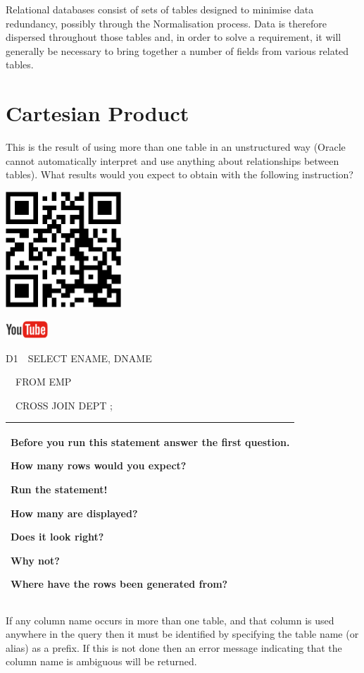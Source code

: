 Relational databases consist of sets of tables designed to minimise data redundancy, possibly through the Normalisation process.  Data is therefore dispersed throughout those tables and, in order to solve a requirement, it will generally be necessary to bring together a number of fields from various related tables.  

\section{Cartesian Product}
This is the result of using more than one table in an unstructured way (Oracle cannot automatically interpret and use anything about relationships between tables).  What results would you expect to obtain with the following  instruction?



\begin{center}
\begin{minipage}{4.849cm}
   
\includegraphics[width=4.341cm,height=4.341cm]{images/img (36).png}
 

   
\includegraphics[width=1.582cm,height=0.674cm]{images/img (15).png}
 
\end{minipage}
\end{center}
D1\ \ SELECT ENAME, DNAME 

\ \ FROM EMP

\ \ CROSS JOIN DEPT ;

\begin{flushleft}
\tablefirsthead{}
\tablehead{}
\tabletail{}
\tablelasttail{}
\begin{supertabular}{|m{9.911cm}|}
\hline
Before you run this statement answer the first question.

How many rows would you expect?

Run the statement!

How many are displayed?

Does it look right?

Why not?

Where have the rows been generated from?\\\hline
\end{supertabular}
\end{flushleft}
If any column name occurs in more than one table, and that column is used anywhere in the query then it must be identified by specifying the table name (or alias) as a prefix.  If this is not done then an error message indicating that the column name is ambiguous will be returned. 

